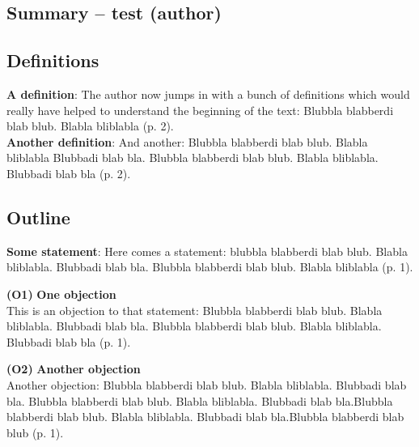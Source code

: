 \documentclass[10pt,a4paper,draft]{report}
\begin{document}
\begin{center}
\section*{Summary -- test (author)}
\end{center}


\subsection*{Definitions}

\textbf{A definition}: The author now jumps in with a bunch of definitions which would really have helped to understand the beginning of the text: Blubbla blabberdi blab blub. Blabla bliblabla (p. 2).\\

\textbf{Another definition}: And another: Blubbla blabberdi blab blub. Blabla bliblabla Blubbadi blab bla. Blubbla blabberdi blab blub. Blabla bliblabla. Blubbadi blab bla (p. 2).\\



\subsection*{Outline}

\textbf{Some statement}: 
Here comes a statement: blubbla blabberdi blab blub. Blabla bliblabla. Blubbadi blab bla. Blubbla blabberdi blab blub. Blabla bliblabla (p. 1).\\


\setlength{\leftskip}{1cm}

\textbf{(O1)} \textbf{One objection}\\
This is an objection to that statement: Blubbla blabberdi blab blub. Blabla bliblabla. Blubbadi blab bla. Blubbla blabberdi blab blub. Blabla bliblabla. Blubbadi blab bla (p. 1).\\

\setlength{\leftskip}{0cm}


\setlength{\leftskip}{1cm}

\textbf{(O2)} \textbf{Another objection}\\
Another objection: Blubbla blabberdi blab blub. Blabla bliblabla. Blubbadi blab bla. Blubbla blabberdi blab blub. Blabla bliblabla. Blubbadi blab bla.Blubbla blabberdi blab blub. Blabla bliblabla. Blubbadi blab bla.Blubbla blabberdi blab blub (p. 1).\\
\end{document}
